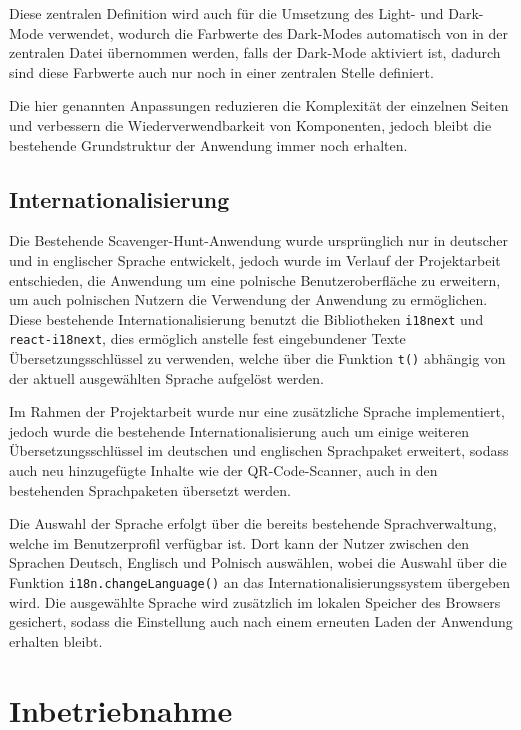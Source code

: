 ﻿\documentclass[oneside]{ausarbeitung}
\begin{document}
Diese zentralen Definition wird auch für die Umsetzung des Light- und Dark-Mode verwendet, wodurch die Farbwerte des Dark-Modes automatisch von
in der zentralen Datei übernommen werden, falls der Dark-Mode aktiviert ist, dadurch sind diese Farbwerte auch nur noch in einer zentralen Stelle
definiert.

Die hier genannten Anpassungen reduzieren die Komplexität der einzelnen Seiten und verbessern die Wiederverwendbarkeit von Komponenten, jedoch
bleibt die bestehende Grundstruktur der Anwendung immer noch erhalten.


\section{Internationalisierung}
\label{sec:implementierung-internationalisierung}

Die Bestehende Scavenger-Hunt-Anwendung wurde ursprünglich nur in deutscher und in englischer Sprache entwickelt, jedoch wurde im Verlauf der
Projektarbeit entschieden, die Anwendung um eine polnische Benutzeroberfläche zu erweitern, um auch polnischen Nutzern die Verwendung der
Anwendung zu ermöglichen. Diese bestehende Internationalisierung benutzt die Bibliotheken \texttt{i18next} und \texttt{react-i18next}, dies 
ermöglich anstelle fest eingebundener Texte Übersetzungsschlüssel zu verwenden, welche über die Funktion \texttt{t()} abhängig von der aktuell
ausgewählten Sprache aufgelöst werden.

Im Rahmen der Projektarbeit wurde nur eine zusätzliche Sprache implementiert, jedoch wurde die bestehende Internationalisierung auch um einige
weiteren Übersetzungsschlüssel im deutschen und englischen Sprachpaket erweitert, sodass auch neu hinzugefügte Inhalte wie der QR-Code-Scanner,
auch in den bestehenden Sprachpaketen übersetzt werden. 

Die Auswahl der Sprache erfolgt über die bereits bestehende Sprachverwaltung, welche im Benutzerprofil verfügbar ist. Dort kann der Nutzer zwischen
den Sprachen Deutsch, Englisch und Polnisch auswählen, wobei die Auswahl über die Funktion \texttt{i18n.changeLanguage()} an das
Internationalisierungssystem übergeben wird. Die ausgewählte Sprache wird zusätzlich im lokalen Speicher des Browsers gesichert, sodass die
Einstellung auch nach einem erneuten Laden der Anwendung erhalten bleibt.



\chapter{Inbetriebnahme}
\label{cha:inbetriebnahme}
\end{document}
